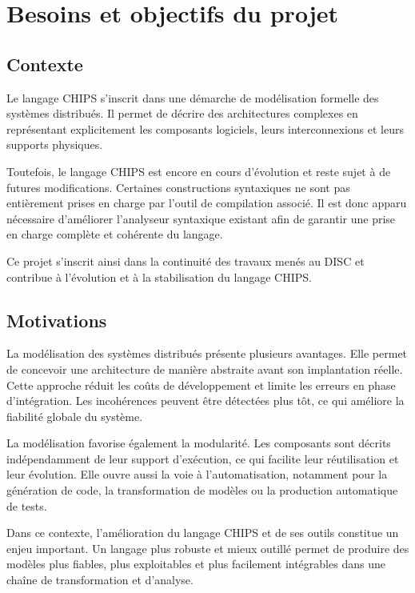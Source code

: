 \documentclass[a4paper, 11pt]{article}
\begin{document}
\section{Besoins et objectifs du projet}
\label{sec:besoins_objectifs}

\subsection{Contexte}
Le langage CHIPS s’inscrit dans une démarche de modélisation formelle des systèmes distribués. Il permet de décrire des architectures complexes en représentant explicitement les composants logiciels, leurs interconnexions et leurs supports physiques.

Toutefois, le langage CHIPS est encore en cours d'évolution et reste sujet à de futures modifications. Certaines constructions syntaxiques ne sont pas entièrement prises en charge par l'outil de compilation associé. Il est donc apparu nécessaire d'améliorer l'analyseur syntaxique existant afin de garantir une prise en charge complète et cohérente du langage.

Ce projet s’inscrit ainsi dans la continuité des travaux menés au DISC et contribue à l’évolution et à la stabilisation du langage CHIPS.

\subsection{Motivations}
La modélisation des systèmes distribués présente plusieurs avantages. Elle permet de concevoir une architecture de manière abstraite avant son implantation réelle. Cette approche réduit les coûts de développement et limite les erreurs en phase d’intégration. Les incohérences peuvent être détectées plus tôt, ce qui améliore la fiabilité globale du système.

La modélisation favorise également la modularité. Les composants sont décrits indépendamment de leur support d’exécution, ce qui facilite leur réutilisation et leur évolution. Elle ouvre aussi la voie à l’automatisation, notamment pour la génération de code, la transformation de modèles ou la production automatique de tests.

Dans ce contexte, l’amélioration du langage CHIPS et de ses outils constitue un enjeu important. Un langage plus robuste et mieux outillé permet de produire des modèles plus fiables, plus exploitables et plus facilement intégrables dans une chaîne de transformation et d’analyse.
\end{document}

